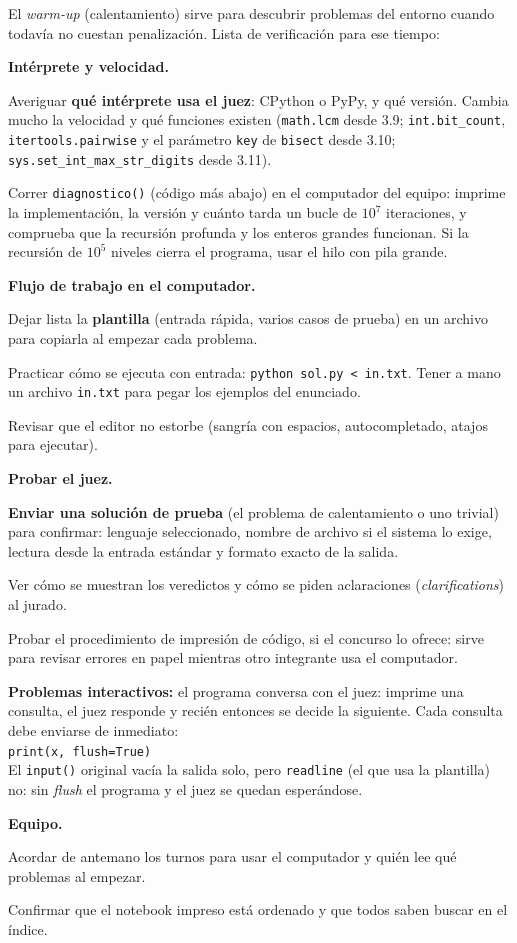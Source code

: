 El \textit{warm-up} (calentamiento) sirve para descubrir problemas del entorno cuando todavía no cuestan penalización. Lista de verificación para ese tiempo:

\textbf{Intérprete y velocidad.}
\begin{props}
  \item Averiguar \textbf{qué intérprete usa el juez}: CPython o PyPy, y qué versión. Cambia mucho la velocidad y qué funciones existen (\texttt{math.lcm} desde 3.9; \texttt{int.bit\_count}, \texttt{itertools.pairwise} y el parámetro \texttt{key} de \texttt{bisect} desde 3.10; \texttt{sys.set\_int\_max\_str\_digits} desde 3.11).
  \item Correr \texttt{diagnostico()} (código más abajo) en el computador del equipo: imprime la implementación, la versión y cuánto tarda un bucle de \(10^7\) iteraciones, y comprueba que la recursión profunda y los enteros grandes funcionan. Si la recursión de \(10^5\) niveles cierra el programa, usar el hilo con pila grande.
\end{props}

\textbf{Flujo de trabajo en el computador.}
\begin{props}
  \item Dejar lista la \textbf{plantilla} (entrada rápida, varios casos de prueba) en un archivo para copiarla al empezar cada problema.
  \item Practicar cómo se ejecuta con entrada: \texttt{python sol.py < in.txt}. Tener a mano un archivo \texttt{in.txt} para pegar los ejemplos del enunciado.
  \item Revisar que el editor no estorbe (sangría con espacios, autocompletado, atajos para ejecutar).
\end{props}

\textbf{Probar el juez.}
\begin{props}
  \item \textbf{Enviar una solución de prueba} (el problema de calentamiento o uno trivial) para confirmar: lenguaje seleccionado, nombre de archivo si el sistema lo exige, lectura desde la entrada estándar y formato exacto de la salida.
  \item Ver cómo se muestran los veredictos y cómo se piden aclaraciones (\textit{clarifications}) al jurado.
  \item Probar el procedimiento de impresión de código, si el concurso lo ofrece: sirve para revisar errores en papel mientras otro integrante usa el computador.
  \item \textbf{Problemas interactivos:} el programa conversa con el juez: imprime una consulta, el juez responde y recién entonces se decide la siguiente. Cada consulta debe enviarse de inmediato:\\ \texttt{print(x, flush=True)}\\ El \texttt{input()} original vacía la salida solo, pero \texttt{readline} (el que usa la plantilla) no: sin \textit{flush} el programa y el juez se quedan esperándose.
\end{props}

\textbf{Equipo.}
\begin{props}
  \item Acordar de antemano los turnos para usar el computador y quién lee qué problemas al empezar.
  \item Confirmar que el notebook impreso está ordenado y que todos saben buscar en el índice.
\end{props}
